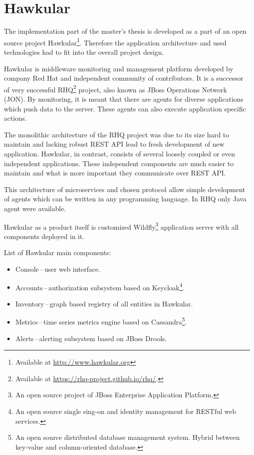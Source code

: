     \section{Hawkular} \label{sec:hawkular}
    The implementation part of the master's thesis is developed as a part of an open source project
    Hawkular\footnote{Available at \url{http://www.hawkular.org}}. Therefore the application architecture and used
    technologies had to fit into the overall project design.

    Hawkular is middleware monitoring and management platform developed by company Red Hat and independent community
    of contributors. It is a successor of very successful RHQ\footnote{Available at
    \url{https://rhq-project.github.io/rhq/}.} project, also known as JBoss Operations Network (JON). By monitoring,
    it is meant that there are agents for diverse applications which push data to the server. These agents can also
    execute application specific actions.

    The monolithic architecture of the RHQ project was due to its size hard to maintain and lacking robust REST API
    lead to fresh development of new application. Hawkular, in contrast, consists of several loosely coupled or even
    independent applications. These independent components are much easier to maintain and what is more important they
    communicate over REST API.

    This architecture of microservices and chosen protocol allow simple development of agents which can be
    written in any programming language. In RHQ only Java agent were available.

    Hawkular as a product itself is customized
    Wildfly\footnote{An open source project of JBoss Enterprise Application Platform.} application server with all
    components deployed in it.

    List of Hawkular main components:
    \begin{itemize}
        \item Console\,--\,user web interface.
        \item Accounts\,--\,authorization subsystem based on Keycloak\footnote{An open
            source single sing-on and identity management for RESTful web services.}.
        \item Inventory\,--\,graph based registry of all entities in Hawkular.
        \item Metrics\,--\,time series metrics engine based on Cassandra\footnote{An open
            source distributed database management system. Hybrid between key-value and
        column-oriented database.}.
        \item Alerts\,--\,alerting subsystem based on JBoss Drools.
    \end{itemize}

